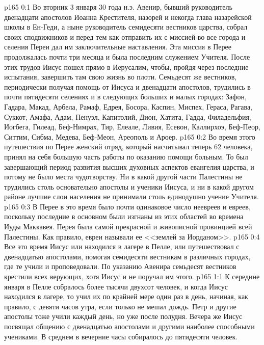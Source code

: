 \vs p165 0:1 Во вторник 3 января 30 года н.э. Авенир, бывший руководитель двенадцати апостолов Иоанна Крестителя, назорей и некогда глава назарейской школы в Ен\hyp{}Геди, а ныне руководитель семидесяти вестников царства, собрал своих сподвижников и перед тем как отправить их с миссией во все города и селения Переи дал им заключительные наставления. Эта миссия в Перее продолжалась почти три месяца и была последним служением Учителя. После этих трудов Иисус пошел прямо в Иерусалим, чтобы, пройдя через последние испытания, завершить там свою жизнь во плоти. Семьдесят же вестников, периодически получая помощь от Иисуса и двенадцати апостолов, трудились в почти пятидесяти селениях и в следующих больших и малых городах: Зафон, Гадара, Макад, Арбела, Рамаф, Едрея, Босора, Каспин, Миспех, Гераса, Рагава, Суккот, Амафа, Адам, Пенуэл, Капитолий, Дион, Хатита, Гадда, Филадельфия, Иогбега, Гилеад, Беф\hyp{}Нимрах, Тир, Елеале, Ливия, Есевон, Каллирхоэ, Беф\hyp{}Пеор, Ситтим, Сибма, Медева, Беф\hyp{}Меон, Ареополь и Ароер.
\vs p165 0:2 Во время этого путешествия по Перее женский отряд, который насчитывал теперь 62 человека, принял на себя большую часть работы по оказанию помощи больным. То был завершающий период развития высших духовных аспектов евангелия царства, и потому не было места чудотворству. Ни в какой другой части Палестины не трудились столь основательно апостолы и ученики Иисуса, и ни в какой другом районе лучшие слои населения не принимали столь единодушно учение Учителя.
\vs p165 0:3 В Перее в это время было почти одинаковое число неевреев и евреев, поскольку последние в основном были изгнаны из этих областей во времена Иуды Маккавея. Перея была самой прекрасной и живописной провинцией всей Палестины. Как правило, евреи называли ее <<землей за Иорданом>>.
\vs p165 0:4 Все это время Иисус или находился в лагере в Пелле, или путешествовал с двенадцатью апостолами, помогая семидесяти вестникам в различных городах, где те учили и проповедовали. По указанию Авенира семьдесят вестников крестили всех верующих, хотя Иисус и не поручал им этого.
\vs p165 1:1 К середине января в Пелле собралось более тысячи двухсот человек, и когда Иисус находился в лагере, то учил их по крайней мере один раз в день, начиная, как правило, с девяти часов утра, если только не мешал дождь. Петр и другие апостолы тоже учили каждый день, но уже после полудня. Вечера же Иисус посвящал общению с двенадцатью апостолами и другими наиболее способными учениками. В среднем в вечерние часы собиралось до пятидесяти человек.
